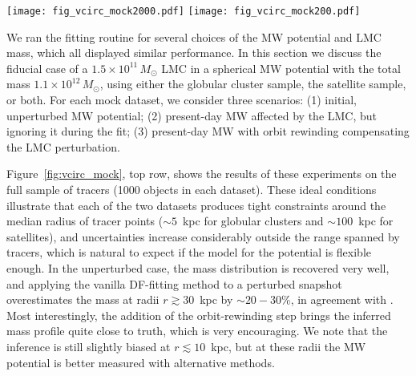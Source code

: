 \documentclass[usenatbib,fleqn]{mnras}
\begin{document}
\begin{figure*}
\texttt{[image: fig\_vcirc\_mock2000.pdf]}
\texttt{[image: fig\_vcirc\_mock200.pdf]}
\caption{Tests of the method on mock datasets, described in Section~\ref{sec:mock_variants}: top row shows large datasets (1000 objects in each), bottom row -- realistic sizes (150 globular clusters and 50 satellites). Each panel shows the inferred circular-velocity profiles $v_\text{circ}(r) \equiv \sqrt{G\,M(<r)/r}$ for two mock catalogues, representing globular clusters (red) and satellites (blue), and in the bottom row, the combined sample (green); the true profile is plotted by a black dashed curve. Solid lines show the medians, while darker and lighter shaded regions indicate 16/84 and 2.3/97.7 percentiles (``1$\sigma$'' and ``2$\sigma$'' confidence intervals). Naturally, the constraints are tightest in different radial ranges for the two datasets: around $5-10$~kpc for clusters and 100~kpc for dSph. \textbf{Left panel} shows the initial, unperturbed system before the arrival of the LMC, which illustrates excellent performance of the method in the ideal case. \textbf{Centre panel} shows the fit for the present-day snapshot perturbed by the LMC, but without accounting for it in the model, which leads to an overestimate of enclosed mass beyond a few tens kpc. \textbf{Right panel} demonstrates that with the orbit rewinding scheme in place, the model is able to recover the true potential.
}  \label{fig:vcirc_mock}
\end{figure*}

We ran the fitting routine for several choices of the MW potential and LMC mass, which all displayed similar performance. In this section we discuss the fiducial case of a $1.5\times10^{11}\,M_\odot$ LMC in a spherical MW potential with the total mass $1.1\times10^{12}\,M_\odot$, using either the globular cluster sample, the satellite sample, or both. For each mock dataset, we consider three scenarios: (1) initial, unperturbed MW potential; (2) present-day MW affected by the LMC, but ignoring it during the fit; (3) present-day MW with orbit rewinding compensating the LMC perturbation. 

Figure~\ref{fig:vcirc_mock}, top row, shows the results of these experiments on the full sample of tracers (1000 objects in each dataset). These ideal conditions illustrate that each of the two datasets produces tight constraints around the median radius of tracer points ($\sim 5$~kpc for globular clusters and $\sim 100$~kpc for satellites), and uncertainties increase considerably outside the range spanned by tracers, which is natural to expect if the model for the potential is flexible enough. In the unperturbed case, the mass distribution is recovered very well, and applying the vanilla DF-fitting method to a perturbed snapshot overestimates the mass at radii $r\gtrsim 30$~kpc by $\sim20-30$\%, in agreement with \citet{Erkal2020b}. Most interestingly, the addition of the orbit-rewinding step brings the inferred mass profile quite close to truth, which is very encouraging. We note that the inference is still slightly biased at $r\lesssim 10$~kpc, but at these radii the MW potential is better measured with alternative methods. 
\end{document}
